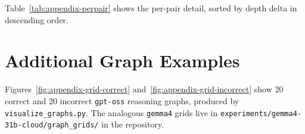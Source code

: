 \documentclass[letterpaper]{article}
\begin{document}
Table~\ref{tab:appendix-perpair} shows the per-pair detail, sorted
by depth delta in descending order.

\begin{table}[t]
\centering
\small
{}
\caption{Per-pair feature deltas for the 14 discordant problems.
$d_c$ and $d_i$ are the depths of the correct and incorrect
traces; $\Delta d$ and $\Delta s$ are the depth and step count
deltas (incorrect $-$ correct).}
\label{tab:appendix-perpair}
\end{table}

\section{Additional Graph Examples}
\label{app:examples}

Figures~\ref{fig:appendix-grid-correct} and~\ref{fig:appendix-grid-incorrect}
show 20 correct and 20 incorrect \texttt{gpt-oss} reasoning graphs, produced
by \texttt{visualize\_graphs.py}.
The analogous \texttt{gemma4} grids live in
\texttt{experiments/gemma4-31b-cloud/graph\_grids/} in the repository.
\end{document}
